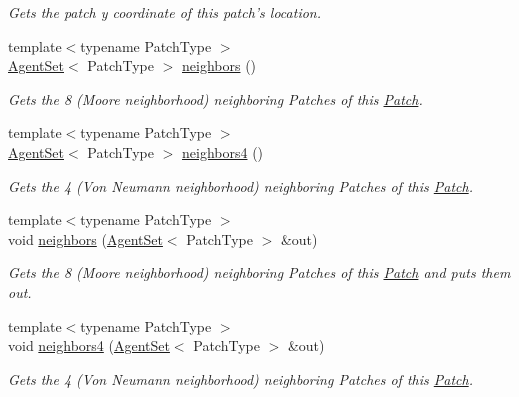 \begin{DoxyCompactItemize}
\begin{DoxyCompactList}\small\item\em Gets the patch y coordinate of this patch's location. \end{DoxyCompactList}\item 
{\footnotesize template$<$typename Patch\-Type $>$ }\\\hyperlink{classrepast_1_1relogo_1_1_agent_set}{Agent\-Set}$<$ Patch\-Type $>$ \hyperlink{classrepast_1_1relogo_1_1_patch_a932368812cacb950454ceec64bf621e1}{neighbors} ()
\begin{DoxyCompactList}\small\item\em Gets the 8 (Moore neighborhood) neighboring Patches of this \hyperlink{classrepast_1_1relogo_1_1_patch}{Patch}. \end{DoxyCompactList}\item 
{\footnotesize template$<$typename Patch\-Type $>$ }\\\hyperlink{classrepast_1_1relogo_1_1_agent_set}{Agent\-Set}$<$ Patch\-Type $>$ \hyperlink{classrepast_1_1relogo_1_1_patch_a0e372725c27abb4e9b2b6ae61cfc4540}{neighbors4} ()
\begin{DoxyCompactList}\small\item\em Gets the 4 (Von Neumann neighborhood) neighboring Patches of this \hyperlink{classrepast_1_1relogo_1_1_patch}{Patch}. \end{DoxyCompactList}\item 
{\footnotesize template$<$typename Patch\-Type $>$ }\\void \hyperlink{classrepast_1_1relogo_1_1_patch_a23f5d9dbecd26acb74d71bd05c36ce77}{neighbors} (\hyperlink{classrepast_1_1relogo_1_1_agent_set}{Agent\-Set}$<$ Patch\-Type $>$ \&out)
\begin{DoxyCompactList}\small\item\em Gets the 8 (Moore neighborhood) neighboring Patches of this \hyperlink{classrepast_1_1relogo_1_1_patch}{Patch} and puts them out. \end{DoxyCompactList}\item 
{\footnotesize template$<$typename Patch\-Type $>$ }\\void \hyperlink{classrepast_1_1relogo_1_1_patch_aa157e0a9f7028a911a7abde580889511}{neighbors4} (\hyperlink{classrepast_1_1relogo_1_1_agent_set}{Agent\-Set}$<$ Patch\-Type $>$ \&out)
\begin{DoxyCompactList}\small\item\em Gets the 4 (Von Neumann neighborhood) neighboring Patches of this \hyperlink{classrepast_1_1relogo_1_1_patch}{Patch}. \end{DoxyCompactList}\end{DoxyCompactItemize}
